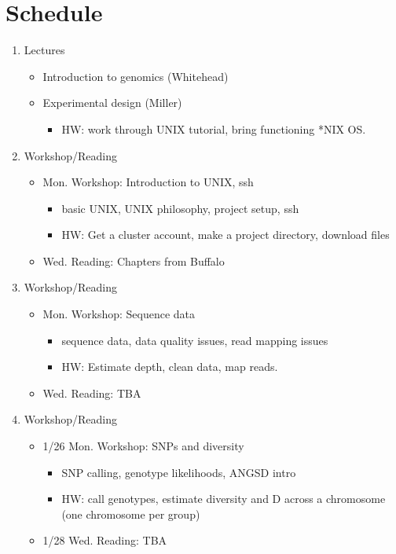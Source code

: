 \documentclass[]{article}
\begin{document}
\section*{Schedule}
\begin{enumerate}

\item Lectures
\begin{itemize}
\item Introduction to genomics (Whitehead)
\item Experimental design (Miller)
	\begin{itemize}
	\item HW: work through UNIX tutorial, bring functioning *NIX OS.
	\end{itemize}
\end{itemize}

\item Workshop/Reading
\begin{itemize}
	\item Mon. Workshop: Introduction to UNIX, ssh
	\begin{itemize}
		\item basic UNIX, UNIX philosophy, project setup, ssh
		\item HW: Get a cluster account, make a project directory, download files
	\end{itemize}
	\item Wed. Reading: Chapters from Buffalo
\end{itemize}

\item Workshop/Reading
	\begin{itemize}
	\item Mon. Workshop: Sequence data
		\begin{itemize}
		\item sequence data, data quality issues, read mapping issues
		\item HW: Estimate depth, clean data, map reads.
		\end{itemize}
	\item Wed. Reading: TBA
\end{itemize}

\item Workshop/Reading
	\begin{itemize}
	\item 1/26 Mon. Workshop: SNPs and diversity
		\begin{itemize}
		\item SNP calling, genotype likelihoods, ANGSD intro
		\item HW: call genotypes, estimate diversity and D across a chromosome (one chromosome per group)
		\end{itemize}
	\item 1/28 Wed. Reading: TBA
\end{itemize}


\end{enumerate}
\end{document}
